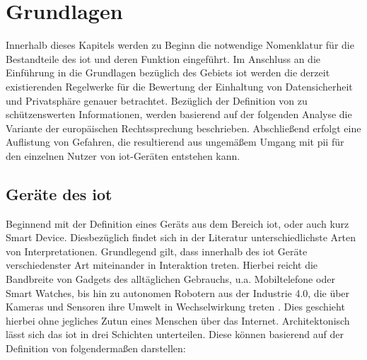 
\section{Grundlagen}
\label{sec:Grundlagen}

Innerhalb dieses Kapitels werden zu Beginn die notwendige Nomenklatur für die Bestandteile des \ac{iot} und deren Funktion eingeführt. Im Anschluss an die Einführung in die Grundlagen bezüglich des Gebiets \ac{iot} werden die derzeit existierenden Regelwerke für die Bewertung der Einhaltung von Datensicherheit und Privatsphäre genauer betrachtet. Bezüglich der Definition von zu schützenswerten Informationen, werden basierend auf der folgenden Analyse die Variante der europäischen Rechtssprechung beschrieben. Abschließend erfolgt eine Auflistung von Gefahren, die resultierend aus ungemäßem Umgang mit \ac{pii} für den einzelnen Nutzer von \ac{iot}-Geräten entstehen kann.

\subsection{Geräte des \acl{iot}}
\label{sec:Grundlagen:sssec:Geräte des Internet of Things}

Beginnend mit der Definition eines Geräts aus dem Bereich \ac{iot}, oder auch kurz Smart Device. Diesbezüglich findet sich in der Literatur unterschiedlichste Arten von Interpretationen. Grundlegend gilt, dass innerhalb des \acs{iot} Geräte verschiedenster Art miteinander in Interaktion treten. Hierbei reicht die Bandbreite von Gadgets des alltäglichen Gebrauchs, u.a. Mobiltelefone oder Smart Watches, bis hin zu autonomen Robotern aus der Industrie 4.0, die über Kameras und Sensoren ihre Umwelt in Wechselwirkung treten \cite{Li2015}. Dies geschieht hierbei ohne jegliches Zutun eines Menschen über das Internet. Architektonisch lässt sich das \ac{iot} in drei Schichten unterteilen. Diese können basierend auf der Definition von \cite{Seliem2018} folgendermaßen darstellen:

